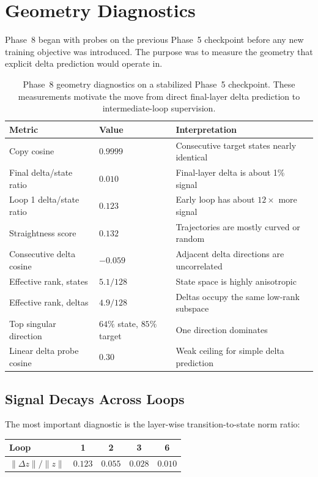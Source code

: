 \section{Geometry Diagnostics}
\label{sec:geometry}

Phase~8 began with probes on the previous Phase~5 checkpoint before any
new training objective was introduced.  The purpose was to measure the
geometry that explicit delta prediction would operate in.

\begin{table}[t]
\centering
\caption{Phase~8 geometry diagnostics on a stabilized Phase~5
checkpoint.  These measurements motivate the move from direct final-layer
delta prediction to intermediate-loop supervision.}
\label{tab:geometry}
\smallskip
\begin{tabular}{lll}
\toprule
Metric & Value & Interpretation \\
\midrule
Copy cosine & $0.9999$ & Consecutive target states nearly identical \\
Final delta/state ratio & $0.010$ & Final-layer delta is about 1\% signal \\
Loop 1 delta/state ratio & $0.123$ & Early loop has about $12\times$ more signal \\
Straightness score & $0.132$ & Trajectories are mostly curved or random \\
Consecutive delta cosine & $-0.059$ & Adjacent delta directions are uncorrelated \\
Effective rank, states & $5.1/128$ & State space is highly anisotropic \\
Effective rank, deltas & $4.9/128$ & Deltas occupy the same low-rank subspace \\
Top singular direction & $64\%$ state, $85\%$ target & One direction dominates \\
Linear delta probe cosine & $0.30$ & Weak ceiling for simple delta prediction \\
\bottomrule
\end{tabular}
\end{table}

\subsection{Signal Decays Across Loops}

The most important diagnostic is the layer-wise
transition-to-state norm ratio:
\begin{center}
\begin{tabular}{lcccc}
\toprule
Loop & 1 & 2 & 3 & 6 \\
\midrule
$\|\Delta z\|/\|z\|$ & $0.123$ & $0.055$ & $0.028$ & $0.010$ \\
\bottomrule
\end{tabular}
\end{center}

